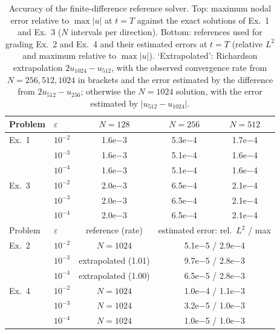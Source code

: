 \begin{table}[!htb]
\centering\small
\caption{Accuracy of the finite-difference reference solver. Top: maximum nodal error relative to $\max|u|$ at $t=T$ against the exact solutions of Ex.~1 and Ex.~3 ($N$ intervals per direction). Bottom: references used for grading Ex.~2 and Ex.~4 and their estimated errors at $t=T$ (relative $L^2$ and maximum relative to $\max|u|$). `Extrapolated': Richardson extrapolation $2u_{1024}-u_{512}$, with the observed convergence rate from $N=256,512,1024$ in brackets and the error estimated by the difference from $2u_{512}-u_{256}$; otherwise the $N=1024$ solution, with the error estimated by $|u_{512}-u_{1024}|$.}
\label{tab:reference}
\begin{tabular}{llccc}
\toprule
Problem & $\varepsilon$ & $N=128$ & $N=256$ & $N=512$ \\
\midrule
Ex.~1 & $10^{-2}$ & 1.6e$-$3 & 5.3e$-$4 & 1.7e$-$4 \\
 & $10^{-3}$ & 1.6e$-$3 & 5.1e$-$4 & 1.6e$-$4 \\
 & $10^{-4}$ & 1.6e$-$3 & 5.1e$-$4 & 1.6e$-$4 \\
Ex.~3 & $10^{-2}$ & 2.0e$-$3 & 6.5e$-$4 & 2.1e$-$4 \\
 & $10^{-3}$ & 2.0e$-$3 & 6.5e$-$4 & 2.1e$-$4 \\
 & $10^{-4}$ & 2.0e$-$3 & 6.5e$-$4 & 2.1e$-$4 \\
\midrule
Problem & $\varepsilon$ & reference (rate) & \multicolumn{2}{c}{estimated error: rel.\ $L^2$ / max} \\
\midrule
Ex.~2 & $10^{-2}$ & $N=1024$ & \multicolumn{2}{c}{5.1e$-$5 / 2.9e$-$4} \\
 & $10^{-3}$ & extrapolated (1.01) & \multicolumn{2}{c}{9.7e$-$5 / 2.8e$-$3} \\
 & $10^{-4}$ & extrapolated (1.00) & \multicolumn{2}{c}{6.5e$-$5 / 2.8e$-$3} \\
Ex.~4 & $10^{-2}$ & $N=1024$ & \multicolumn{2}{c}{1.0e$-$4 / 1.1e$-$3} \\
 & $10^{-3}$ & $N=1024$ & \multicolumn{2}{c}{3.2e$-$5 / 1.0e$-$3} \\
 & $10^{-4}$ & $N=1024$ & \multicolumn{2}{c}{1.0e$-$5 / 1.0e$-$3} \\
\bottomrule
\end{tabular}
\end{table}
